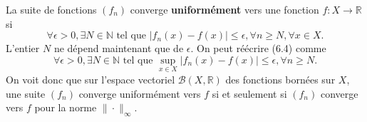 \documentclass{article}
\newcommand{\R}{\mathbb{R}}
\newcommand{\N}{\mathbb{N}}
\begin{document}
La suite de fonctions $(f_n)$ converge \textbf{uniformément} vers une fonction $f : X \to \R$ si
\begin{equation} \label{eq:conv_unif}
\forall \epsilon > 0, \exists N \in \N \text{ tel que } |f_n(x) - f(x)| \leq \epsilon, \forall n \geq N, \forall x \in X.
\end{equation}
L'entier $N$ ne dépend maintenant que de $\epsilon$. On peut réécrire (6.4) comme
\begin{equation} \label{eq:conv_unif_sup}
\forall \epsilon > 0, \exists N \in \N \text{ tel que } \sup_{x \in X} |f_n(x) - f(x)| \leq \epsilon, \forall n \geq N.
\end{equation}
On voit donc que sur l'espace vectoriel $\mathcal{B}(X, \R)$ des fonctions bornées sur $X$, une suite $(f_n)$ converge uniformément vers $f$ si et seulement si $(f_n)$ converge vers $f$ pour la norme $\|\cdot\|_\infty$.
\end{document}
